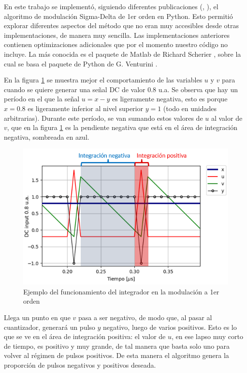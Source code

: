 \documentclass[twoside]{article}
\begin{document}
\begin{multicols}{2}
En este trabajo se implementó, siguiendo diferentes publicaciones (\cite{delarosa2011}, \cite{aziz1996}), el algoritmo de modulación Sigma-Delta de 1er orden en Python. Esto permitió explorar diferentes aspectos del método que no eran muy accesibles desde otras implementaciones, de manera muy sencilla.
Las implementaciones anteriores contienen optimizaciones adicionales que por el momento nuestro código no incluye. La más conocida es el paquete de Matlab de Richard Scherier \cite{DSmatlab}, sobre la cual se basa el paquete de Python de G. Venturini \cite{DSpython}. %

En la figura \ref{fig:integrador} se muestra mejor el comportamiento de las variables $u$ y $v$ para cuando se quiere generar una señal DC de valor 0.8 u.a. Se observa que hay un período en el que la señal $u=x-y$ es ligeramente negativa, esto es porque $x=0.8$ es ligeramente inferior al nivel superior $y=1$ (todo en unidades arbitrarias). Durante este período, se van sumando estos valores de $u$ al valor de $v$, que en la figura \ref{fig:integrador} es la pendiente negativa que está en el área de integración negativa, sombreada en azul.


\begin{figure}[H]
\centering
\includegraphics[width=\linewidth]{figuras/integracion.png}
\caption{Ejemplo del funcionamiento del integrador en la modulación a 1er orden}
\label{fig:integrador}
\end{figure}

Llega un punto en que $v$ pasa a ser negativo, de modo que, al pasar al cuantizador, generará un pulso $y$ negativo, luego de varios positivos. Esto es lo que se ve en el área de integración positiva: el valor de $u$, en ese lapso muy corto de tiempo, es positivo y muy grande, de tal manera que basta solo uno para volver al régimen de pulsos positivos. De esta manera el algoritmo genera la proporción de pulsos negativos y positivos deseada.




\end{multicols}
\end{document}
